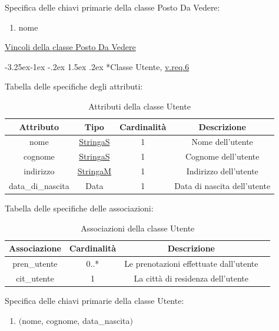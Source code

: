 \documentclass{article}
\makeatletter
\renewcommand\subsection{\@startsection{subsection}{2}{\z@}%
                                     {-3.25ex\@plus -1ex \@minus -.2ex}%
                                     {1.5ex \@plus .2ex}%
                                     {\normalfont\normalsize\bfseries}}
\makeatother
\begin{document}
Specifica delle chiavi primarie della classe Posto Da Vedere:
\begin{enumerate}
    \item nome
\end{enumerate}

\hyperref[sec:VincoliPostoDaVedere]{Vincoli della classe Posto Da Vedere}

\newpage
\subsection*{Classe Utente, \hyperref[sec:RequisitiUtente]{v.req.6}}\label{sec:Utente}

Tabella delle specifiche degli attributi:
\begin{table}[h!]
    \centering
    \begin{tabular}{|c|c|c|c|}
        \hline
        Attributo & Tipo & Cardinalità & Descrizione \\
        \hline
        nome & \hyperref[sec:StringaS]{StringaS} & 1 & Nome dell'utente \\
        cognome & \hyperref[sec:StringaS]{StringaS} & 1 & Cognome dell'utente \\
        indirizzo & \hyperref[sec:StringaM]{StringaM} & 1 & Indirizzo dell'utente \\
        data\_di\_nascita & Data & 1 & Data di nascita dell'utente \\
        \hline
    \end{tabular}
    \caption{Attributi della classe Utente}
\end{table}

Tabella delle specifiche delle associazioni:
\begin{table}[h!]
    \centering
    \begin{tabular}{|c|c|c|c|}
        \hline
        Associazione & Cardinalità & Descrizione \\
        \hline
        pren\_utente & 0..* & Le prenotazioni effettuate dall'utente \\
        cit\_utente & 1 & La città di residenza dell'utente \\
        \hline
    \end{tabular}
    \caption{Associazioni della classe Utente}
\end{table}

Specifica delle chiavi primarie della classe Utente:
\begin{enumerate}
    \item $($nome, cognome, data\_nascita$)$
\end{enumerate}
\end{document}
